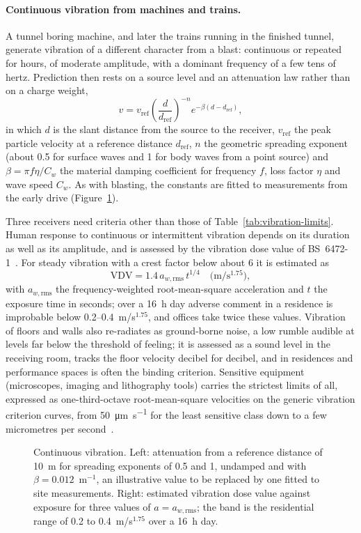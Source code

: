 \paragraph{Continuous vibration from machines and trains.}
A tunnel boring machine, and later the trains running in the finished tunnel,
generate vibration of a different character from a blast: continuous or
repeated for hours, of moderate amplitude, with a dominant frequency of a few
tens of hertz. Prediction then rests on a source level and an attenuation law
rather than on a charge weight,
\[
v = v_{\mathrm{ref}} \left(\frac{d}{d_{\mathrm{ref}}}\right)^{-n}
    e^{-\beta (d - d_{\mathrm{ref}})} ,
\]
in which $d$ is the slant distance from the source to the receiver, $v_{\mathrm{ref}}$
the peak particle velocity at a reference distance $d_{\mathrm{ref}}$, $n$ the
geometric spreading exponent (about 0.5 for surface waves and 1 for body waves
from a point source) and $\beta = \pi f \eta / C_w$ the material damping
coefficient for frequency $f$, loss factor $\eta$ and wave speed $C_w$. As with
blasting, the constants are fitted to measurements from the early drive
(Figure~\ref{fig:continuous-vibration}).

Three receivers need criteria other than those of
Table~\ref{tab:vibration-limits}. Human response to continuous or intermittent
vibration depends on its duration as well as its amplitude, and is assessed by
the vibration dose value of BS~6472-1~\citep{bs6472part1}. For steady vibration
with a crest factor below about 6 it is estimated as
\[
\mathrm{VDV} = 1.4\, a_{w,\mathrm{rms}}\, t^{1/4}
\quad \bigl(\mathrm{m/s^{1.75}}\bigr),
\]
with $a_{w,\mathrm{rms}}$ the frequency-weighted root-mean-square acceleration
and $t$ the exposure time in seconds; over a 16~h day adverse comment in a
residence is improbable below 0.2--0.4~m/s$^{1.75}$, and offices take twice
these values. Vibration of floors and walls also re-radiates as ground-borne
noise, a low rumble audible at levels far below the threshold of feeling; it
is assessed as a sound level in the receiving room, tracks the floor velocity
decibel for decibel, and in residences and performance spaces is often the
binding criterion. Sensitive equipment (microscopes, imaging and lithography
tools) carries the strictest limits of all, expressed as one-third-octave
root-mean-square velocities on the generic vibration criterion curves, from
\SI{50}{\micro\metre\per\second} for the least sensitive class down to a few
micrometres per second~\citep{gordon1991generic}.

\begin{figure}[htbp]
\centering
{}
\caption{Continuous vibration. Left: attenuation from a reference distance of 10~m for spreading exponents of 0.5 and 1, undamped and with $\beta = 0.012$~m$^{-1}$, an illustrative value to be replaced by one fitted to site measurements. Right: estimated vibration dose value against exposure for three values of $a = a_{w,\mathrm{rms}}$; the band is the residential range of 0.2 to 0.4~m/s$^{1.75}$ over a 16~h day.}
\label{fig:continuous-vibration}
\end{figure}

